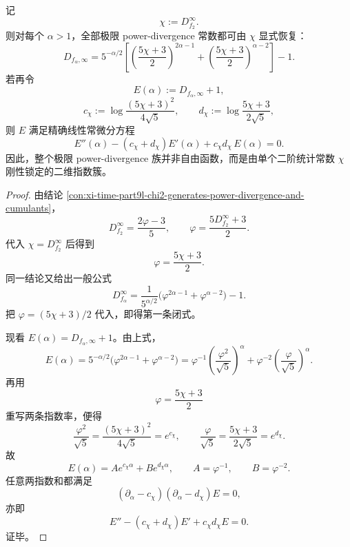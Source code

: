\begin{theorem}\label{thm:xi-time-part64ba-chi2-rigid-powerdivergence-ode}
记
\[
\chi:=D_{f_2}^\infty.
\]
则对每个 \(\alpha>1\)，全部极限 power-divergence 常数都可由 \(\chi\) 显式恢复：
\[
\boxed{\;
D_{f_\alpha,\infty}
=
5^{-\alpha/2}
\left[
\left(\frac{5\chi+3}{2}\right)^{2\alpha-1}
+
\left(\frac{5\chi+3}{2}\right)^{\alpha-2}
\right]-1.\;}
\]
若再令
\[
E(\alpha):=D_{f_\alpha,\infty}+1,
\]
\[
c_\chi:=\log\frac{(5\chi+3)^2}{4\sqrt5},
\qquad
d_\chi:=\log\frac{5\chi+3}{2\sqrt5},
\]
则 \(E\) 满足精确线性常微分方程
\[
\boxed{\;
E''(\alpha)-(c_\chi+d_\chi)E'(\alpha)+c_\chi d_\chi\,E(\alpha)=0.\;}
\]
因此，整个极限 power-divergence 族并非自由函数，而是由单个二阶统计常数 \(\chi\) 刚性锁定的二维指数簇。
\end{theorem}
\begin{proof}
由结论 \ref{con:xi-time-part9l-chi2-generates-power-divergence-and-cumulants}，
\[
D_{f_2}^\infty=\frac{2\varphi-3}{5},
\qquad
\varphi=\frac{5D_{f_2}^\infty+3}{2}.
\]
代入 \(\chi=D_{f_2}^\infty\) 后得到
\[
\varphi=\frac{5\chi+3}{2}.
\]
同一结论又给出一般公式
\[
D_{f_\alpha}^\infty
=
\frac{1}{5^{\alpha/2}}\bigl(\varphi^{2\alpha-1}+\varphi^{\alpha-2}\bigr)-1.
\]
把 \(\varphi=(5\chi+3)/2\) 代入，即得第一条闭式。

现看 \(E(\alpha)=D_{f_\alpha,\infty}+1\)。由上式，
\[
E(\alpha)
=
5^{-\alpha/2}\bigl(\varphi^{2\alpha-1}+\varphi^{\alpha-2}\bigr)
=
\varphi^{-1}\left(\frac{\varphi^2}{\sqrt5}\right)^\alpha
+
\varphi^{-2}\left(\frac{\varphi}{\sqrt5}\right)^\alpha.
\]
再用
\[
\varphi=\frac{5\chi+3}{2}
\]
重写两条指数率，便得
\[
\frac{\varphi^2}{\sqrt5}
=
\frac{(5\chi+3)^2}{4\sqrt5}
=
e^{c_\chi},
\qquad
\frac{\varphi}{\sqrt5}
=
\frac{5\chi+3}{2\sqrt5}
=
e^{d_\chi}.
\]
故
\[
E(\alpha)=A e^{c_\chi\alpha}+B e^{d_\chi\alpha},
\qquad
A=\varphi^{-1},
\qquad
B=\varphi^{-2}.
\]
任意两指数和都满足
\[
(\partial_\alpha-c_\chi)(\partial_\alpha-d_\chi)E=0,
\]
亦即
\[
E''-(c_\chi+d_\chi)E'+c_\chi d_\chi E=0.
\]
证毕。
\end{proof}


